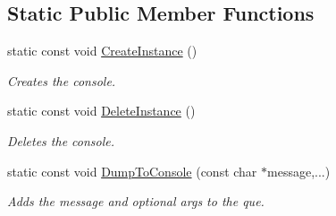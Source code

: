 \subsection*{Static Public Member Functions}
\begin{DoxyCompactItemize}
\item 
static const void \hyperlink{class_ensum_1_1_utils_1_1_console_log_a2081398f0762150043b92047fa97810a}{Create\+Instance} ()\hypertarget{class_ensum_1_1_utils_1_1_console_log_a2081398f0762150043b92047fa97810a}{}\label{class_ensum_1_1_utils_1_1_console_log_a2081398f0762150043b92047fa97810a}

\begin{DoxyCompactList}\small\item\em Creates the console. \end{DoxyCompactList}\item 
static const void \hyperlink{class_ensum_1_1_utils_1_1_console_log_a5510d37e7c7038a022e9ff23f097263d}{Delete\+Instance} ()\hypertarget{class_ensum_1_1_utils_1_1_console_log_a5510d37e7c7038a022e9ff23f097263d}{}\label{class_ensum_1_1_utils_1_1_console_log_a5510d37e7c7038a022e9ff23f097263d}

\begin{DoxyCompactList}\small\item\em Deletes the console. \end{DoxyCompactList}\item 
static const void \hyperlink{class_ensum_1_1_utils_1_1_console_log_a3cb3fc27bd5a6a1a04831e6eb8d79b42}{Dump\+To\+Console} (const char $\ast$message,...)
\begin{DoxyCompactList}\small\item\em Adds the message and optional args to the que. \end{DoxyCompactList}\end{DoxyCompactItemize}
